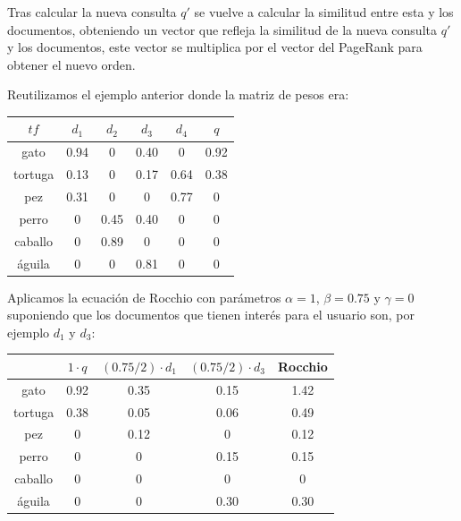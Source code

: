 \documentclass[size=a4, parskip=half, titlepage=false, toc=flat, toc=bib, 12pt, twoside]{scrartcl}
\theoremstyle{theorem-style}
\theoremstyle{definition-style}
\theoremstyle{remark-style}
\theoremstyle{example-style}
\theoremstyle{definition-style}
\theoremstyle{remark-style}
\begin{document}
Tras calcular la nueva consulta $q'$ se vuelve a calcular la similitud entre esta y los documentos, obteniendo un vector que refleja la similitud de la nueva consulta $q'$ y los documentos, este vector se multiplica por el vector del PageRank para obtener el nuevo orden.

Reutilizamos el ejemplo anterior donde la matriz de pesos era:
\begin{table}[H]
\centering
\begin{tabular}{|c|c|c|c|c|c|}
\hline
$tf$    & $d_1$ & $d_2$ & $d_3$ & $d_4$ & $q$  \\ \hline
gato    & 0.94  & 0     & 0.40  & 0     & 0.92 \\ \hline
tortuga & 0.13  & 0     & 0.17  & 0.64  & 0.38 \\ \hline
pez     & 0.31  & 0     & 0     & 0.77  & 0    \\ \hline
perro   & 0     & 0.45  & 0.40  & 0     & 0    \\ \hline
caballo & 0     & 0.89  & 0     & 0     & 0    \\ \hline
águila  & 0     & 0     & 0.81  & 0     & 0    \\ \hline
\end{tabular}
\end{table}
Aplicamos la ecuación de Rocchio con parámetros $\alpha = 1$, $\beta = 0.75$ y $\gamma = 0$ suponiendo que los documentos que tienen interés para el usuario son, por ejemplo $d_1$ y $d_3$:
\begin{table}[H]
\centering
\begin{tabular}{|c|c|c|c|c|}
\hline
 & $1 \cdot q$ & $(0.75/2) \cdot d_1$ & $(0.75/2) \cdot d_3$ & Rocchio \\ \hline
gato    & 0.92        & 0.35                 & 0.15                 & 1.42 \\ \hline
tortuga & 0.38        & 0.05                 & 0.06                 & 0.49 \\ \hline
pez     & 0           & 0.12                 & 0                    & 0.12 \\ \hline
perro   & 0           & 0                    & 0.15                 & 0.15 \\ \hline
caballo & 0           & 0                    & 0                    & 0    \\ \hline
águila  & 0           & 0                    & 0.30                 & 0.30 \\ \hline
\end{tabular}
\end{table}
\end{document}

